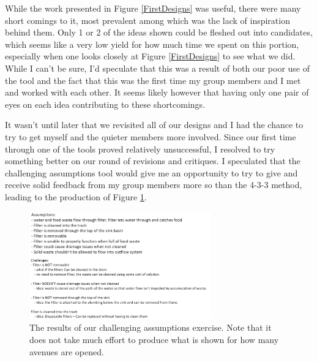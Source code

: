 \documentclass[11pt]{article}
\begin{document}
    While the work presented in Figure \ref{FirstDesigns} was useful, there were many short comings to it, most prevalent among which was the lack of inspiration behind them. Only 1 or 2 of the ideas shown could be fleshed out into candidates, which seems like a very low yield for how much time we spent on this portion, especially when one looks closely at Figure \ref{FirstDesigns} to see what we did. While I can't be sure, I'd speculate that this was a result of both our poor use of the tool and the fact that this was the first time my group members and I met and worked with each other. It seems likely however that having only one pair of eyes on each idea contributing to these shortcomings.

    It wasn't until later that we revisited all of our designs and I had the chance to try to get myself and the quieter members more involved. Since our first time through one of the tools proved relatively unsuccessful, I resolved to try something better on our round of revisions and critiques. I speculated that the challenging assumptions tool would give me an opportunity to try to give and receive solid feedback from my group members more so than the 4-3-3 method, leading to the production of Figure \ref{assumptions}.

    \begin{figure}[H]
        \centering\includegraphics[width = 0.7\textwidth]{assumptions.PNG}
        \caption{The results of our challenging assumptions exercise. Note that it does not take much effort to produce what is shown for how many avenues are opened.}
        \label{assumptions}
    \end{figure}
\end{document}
